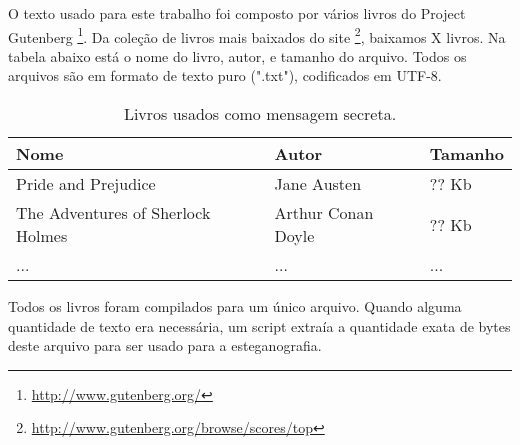 O texto usado para este trabalho foi composto por vários livros do Project Gutenberg \footnote{\url{http://www.gutenberg.org/}}. Da coleção de livros mais baixados do site \footnote{\url{http://www.gutenberg.org/browse/scores/top}}, baixamos X livros. Na tabela abaixo está o nome do livro, autor, e tamanho do arquivo. Todos os arquivos são em formato de texto puro (".txt"), codificados em UTF-8.

\begin{table}
	\begin{tabular}{|l|l|l|}
		\hline
		\textbf{Nome} & \textbf{Autor} & \textbf{Tamanho} \\ \hline
		Pride and Prejudice & Jane Austen & ?? Kb \\ \hline
		The Adventures of Sherlock Holmes & Arthur Conan Doyle & ?? Kb \\ \hline
		... & ... & ... \\ \hline
	\end{tabular}
 	\caption{Livros usados como mensagem secreta.}
\end{table}

Todos os livros foram compilados para um único arquivo. Quando alguma quantidade de texto era necessária, um script extraía a quantidade exata de bytes deste arquivo para ser usado para a esteganografia.
